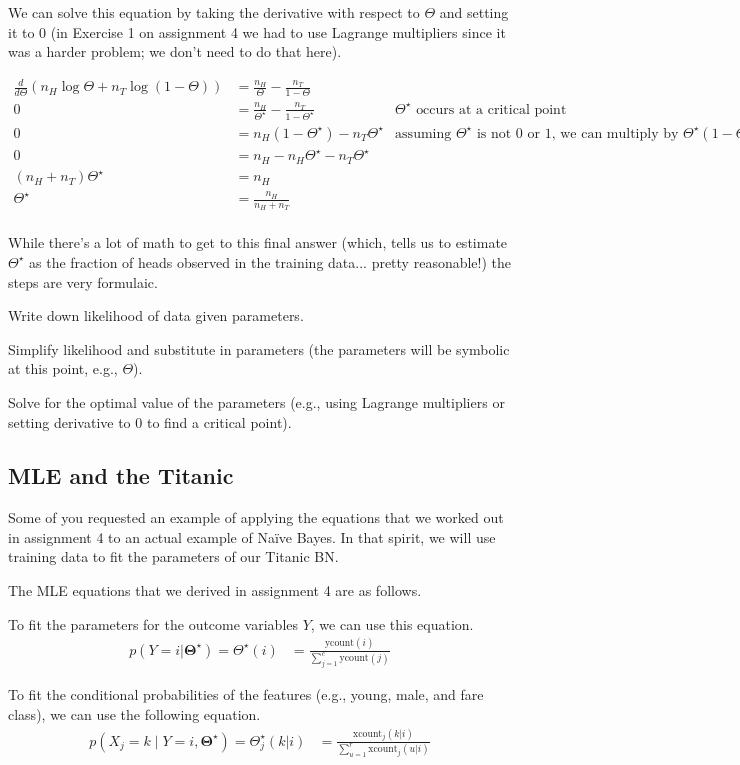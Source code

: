 \documentclass{tufte-handout}
\begin{document}
We can solve this equation by taking the derivative with respect to $\Theta$ and setting it to 0 (in Exercise 1 on assignment 4 we had to use Lagrange multipliers since it was a harder problem; we don't need to do that here).

\begin{align}
\frac{d}{d\Theta} \left ( n_H \log \Theta  + n_T  \log\left (1-  \Theta \right) \right) &=  \frac{n_H}{\Theta} - \frac{n_T}{1-\Theta} \nonumber \\
0 &= \frac{n_H}{\Theta^\star} - \frac{n_T}{1-\Theta^\star} \nonumber & \mbox{$\Theta^\star$ occurs at a critical point}\\
0 &=  n_H(1-\Theta^\star) - n_T \Theta^\star &\mbox{assuming $\Theta^\star$ is not 0 or 1, we can multiply by $\Theta^\star(1-\Theta^\star)$} \nonumber \\
0&= n_H - n_H \Theta^\star -  n_T \Theta^\star \nonumber \\
(n_H + n_T) \Theta^\star &= n_H \nonumber \\
\Theta^\star &= \frac{n_H}{n_H + n_T} \nonumber \\
\end{align}

While there's a lot of math to get to this final answer (which, tells us to estimate $\Theta^\star$ as the fraction of heads observed in the training data... pretty reasonable!) the steps are very formulaic.
\be
\item Write down likelihood of data given parameters.
\item Simplify likelihood and substitute in parameters (the parameters will be symbolic at this point, e.g., $\Theta$).
\item Solve for the optimal value of the parameters (e.g., using Lagrange multipliers or setting derivative to 0 to find a critical point).
\ee

\subsection{MLE and the Titanic}

Some of you requested an example of applying the equations that we worked out in assignment 4 to an actual example of Na\"ive Bayes.  In that spirit, we will use training data to fit the parameters of our Titanic BN.


The MLE equations that we derived in assignment 4 are as follows.

\bi
\item To fit the parameters for the outcome variables $Y$, we can use this equation.
\begin{align}
p(Y=i |  \mathbf{\Theta^\star}) = \Theta^\star(i) &= \frac{\mbox{ycount}(i)}{\sum_{j=1}^c \mbox{ycount}(j)}
\end{align}
\item  To fit the conditional probabilities of the features (e.g., young, male, and fare class), we can use the following equation.
\begin{align}
p(X_j = k \mid Y=i , \mathbf{\Theta^\star}) = \Theta_j^\star(k|i) &= \frac{\mbox{xcount}_j(k|i)}{\sum_{u=1}^r \mbox{xcount}_j(u|i)}
\end{align}
\ei
\end{document}
